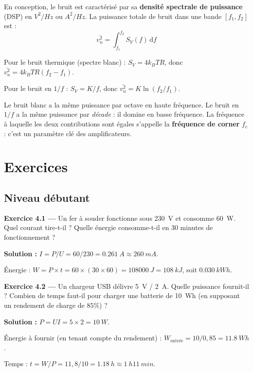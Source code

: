 \documentclass[12pt,a4paper,twoside]{book}
\begin{document}
En conception, le bruit est caractérisé par sa \textbf{densité spectrale de puissance} (DSP) en $\si{V^2/Hz}$ ou $\si{A^2/Hz}$. La puissance totale de bruit dans une bande $[f_1, f_2]$ est :
\[
\overline{v_n^2} = \int_{f_1}^{f_2} S_V(f)\,\mathrm{d}f
\]

Pour le bruit thermique (spectre blanc) : $S_V = 4k_BTR$, donc $\overline{v_n^2} = 4k_BTR(f_2 - f_1)$.

Pour le bruit en $1/f$ : $S_V = K/f$, donc $\overline{v_n^2} = K \ln(f_2/f_1)$.

\begin{intuition}
Le bruit blanc a la même puissance par octave en haute fréquence. Le bruit en $1/f$ a la même puissance par \textit{décade} : il domine en basse fréquence. La fréquence à laquelle les deux contributions sont égales s'appelle la \textbf{fréquence de corner} $f_c$ : c'est un paramètre clé des amplificateurs.
\end{intuition}

\section*{Exercices}

\subsection*{Niveau débutant}

\textbf{Exercice 4.1 —} Un fer à souder fonctionne sous \SI{230}{V} et consomme \SI{60}{W}. Quel courant tire-t-il ? Quelle énergie consomme-t-il en 30 minutes de fonctionnement ?

\begin{pratique}
\textbf{Solution :} $I = P/U = 60/230 = \SI{0.261}{A} \approx \SI{260}{mA}$.

Énergie : $W = P \times t = 60 \times (30 \times 60) = \SI{108000}{J} = \SI{108}{kJ}$, soit $\SI{0.030}{kWh}$.
\end{pratique}

\textbf{Exercice 4.2 —} Un chargeur USB délivre \SI{5}{V} / \SI{2}{A}. Quelle puissance fournit-il ? Combien de temps faut-il pour charger une batterie de \SI{10}{Wh} (en supposant un rendement de charge de $85\%$) ?

\begin{pratique}
\textbf{Solution :} $P = UI = 5 \times 2 = \SI{10}{W}$.

Énergie à fournir (en tenant compte du rendement) : $W_{\text{entrée}} = 10/0{,}85 = \SI{11.8}{Wh}$.

Temps : $t = W/P = 11{,}8/10 = \SI{1.18}{h} \approx \SI{1}{h}\SI{11}{min}$.
\end{pratique}
\end{document}
